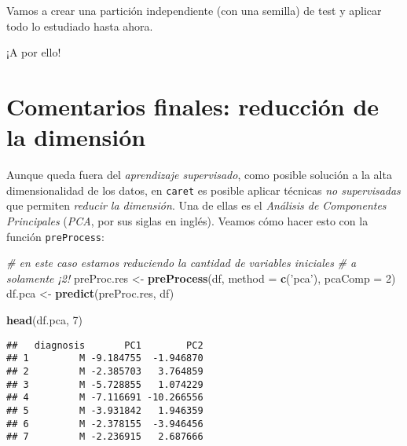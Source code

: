 \documentclass[]{book}
\newenvironment{Shaded}{\begin{snugshade}}{\end{snugshade}}
\newcommand{\CommentTok}[1]{\textcolor[rgb]{0.56,0.35,0.01}{\textit{#1}}}
\newcommand{\DataTypeTok}[1]{\textcolor[rgb]{0.13,0.29,0.53}{#1}}
\newcommand{\DecValTok}[1]{\textcolor[rgb]{0.00,0.00,0.81}{#1}}
\newcommand{\FloatTok}[1]{\textcolor[rgb]{0.00,0.00,0.81}{#1}}
\newcommand{\KeywordTok}[1]{\textcolor[rgb]{0.13,0.29,0.53}{\textbf{#1}}}
\newcommand{\NormalTok}[1]{#1}
\newcommand{\OperatorTok}[1]{\textcolor[rgb]{0.81,0.36,0.00}{\textbf{#1}}}
\newcommand{\OtherTok}[1]{\textcolor[rgb]{0.56,0.35,0.01}{#1}}
\newcommand{\StringTok}[1]{\textcolor[rgb]{0.31,0.60,0.02}{#1}}
\begin{document}
Vamos a crear una partición independiente (con una semilla) de test y aplicar todo lo estudiado hasta ahora.

\begin{Shaded}
\end{Shaded}

¡A por ello!

\hypertarget{comentarios-finales-reducciuxf3n-de-la-dimensiuxf3n}{%
\section{Comentarios finales: reducción de la dimensión}\label{comentarios-finales-reducciuxf3n-de-la-dimensiuxf3n}}

Aunque queda fuera del \emph{aprendizaje supervisado}, como posible solución a la alta dimensionalidad de los datos, en \texttt{caret} es posible aplicar técnicas \emph{no supervisadas} que permiten \emph{reducir la dimensión}. Una de ellas es el \emph{Análisis de Componentes Principales} (\emph{PCA}, por sus siglas en inglés). Veamos cómo hacer esto con la función \texttt{preProcess}:

\begin{Shaded}
\begin{Highlighting}[]
\CommentTok{# en este caso estamos reduciendo la cantidad de variables iniciales}
\CommentTok{# a solamente ¡2!}
\NormalTok{preProc.res <-}\StringTok{ }\KeywordTok{preProcess}\NormalTok{(df, }\DataTypeTok{method =} \KeywordTok{c}\NormalTok{(}\StringTok{'pca'}\NormalTok{), }\DataTypeTok{pcaComp =} \DecValTok{2}\NormalTok{)}
\NormalTok{df.pca <-}\StringTok{ }\KeywordTok{predict}\NormalTok{(preProc.res, df)}

\KeywordTok{head}\NormalTok{(df.pca, }\DecValTok{7}\NormalTok{)}
\end{Highlighting}
\end{Shaded}

\begin{verbatim}
##   diagnosis       PC1        PC2
## 1         M -9.184755  -1.946870
## 2         M -2.385703   3.764859
## 3         M -5.728855   1.074229
## 4         M -7.116691 -10.266556
## 5         M -3.931842   1.946359
## 6         M -2.378155  -3.946456
## 7         M -2.236915   2.687666
\end{verbatim}
\end{document}
